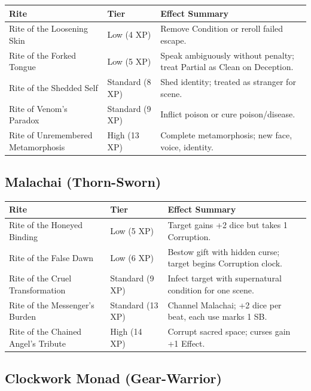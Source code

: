 \begin{longtable}{p{} p{} p{}}
\hline
\textbf{Rite} & \textbf{Tier} & \textbf{Effect Summary} \\
\hline
Rite of the Loosening Skin & Low (4 XP) & Remove Condition or reroll failed escape. \\
Rite of the Forked Tongue & Low (5 XP) & Speak ambiguously without penalty; treat Partial as Clean on Deception. \\
Rite of the Shedded Self & Standard (8 XP) & Shed identity; treated as stranger for scene. \\
Rite of Venom's Paradox & Standard (9 XP) & Inflict poison or cure poison/disease. \\
Rite of Unremembered Metamorphosis & High (13 XP) & Complete metamorphosis; new face, voice, identity. \\
\hline
\end{longtable}

\subsection{Malachai (Thorn-Sworn)}

\begin{longtable}{p{} p{} p{}}
\hline
\textbf{Rite} & \textbf{Tier} & \textbf{Effect Summary} \\
\hline
Rite of the Honeyed Binding & Low (5 XP) & Target gains +2 dice but takes 1 Corruption. \\
Rite of the False Dawn & Low (6 XP) & Bestow gift with hidden curse; target begins Corruption clock. \\
Rite of the Cruel Transformation & Standard (9 XP) & Infect target with supernatural condition for one scene. \\
Rite of the Messenger's Burden & Standard (13 XP) & Channel Malachai; +2 dice per beat, each use marks 1 SB. \\
Rite of the Chained Angel's Tribute & High (14 XP) & Corrupt sacred space; curses gain +1 Effect. \\
\hline
\end{longtable}

\subsection{Clockwork Monad (Gear-Warrior)}

